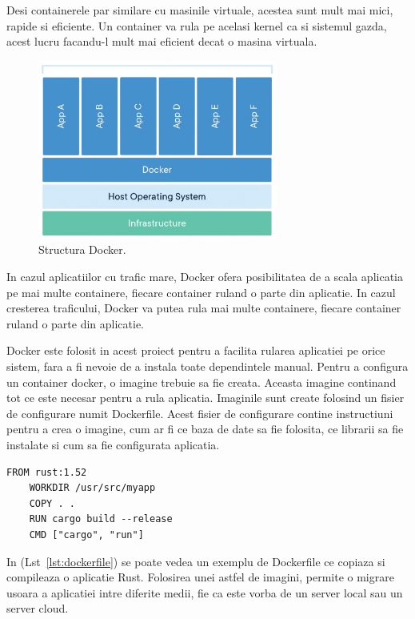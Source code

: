 \documentclass[titlepage,12pt]{article}
\begin{document}
Desi containerele par similare cu masinile virtuale, acestea sunt mult mai mici, rapide si eficiente.
Un container va rula pe acelasi kernel ca si sistemul gazda, acest lucru facandu-l mult mai eficient decat o masina virtuala.

\begin{figure}[H]
    \centering
    \includegraphics[width=0.7\textwidth]{images/dockerstructure}
    \caption{Structura Docker.}
    \label{fig:containerstructure}
\end{figure}

In cazul aplicatiilor cu trafic mare, Docker ofera posibilitatea de a scala aplicatia pe mai multe containere, fiecare container ruland o parte din aplicatie.
In cazul cresterea traficului, Docker va putea rula mai multe containere, fiecare container ruland o parte din aplicatie.

Docker este folosit in acest proiect pentru a facilita rularea aplicatiei pe orice sistem, fara a fi nevoie de a instala toate dependintele manual.
Pentru a configura un container docker, o imagine trebuie sa fie creata.
Aceasta imagine continand tot ce este necesar pentru a rula aplicatia.
Imaginile sunt create folosind un fisier de configurare numit Dockerfile.
Acest fisier de configurare contine instructiuni pentru a crea o imagine, cum ar fi ce baza de date sa fie folosita, ce librarii sa fie instalate si cum sa fie configurata aplicatia.
\begin{lstlisting}[language=docker,caption={Exemplu Dockerfile},label={lst:dockerfile}]
    FROM rust:1.52
    WORKDIR /usr/src/myapp
    COPY . .
    RUN cargo build --release
    CMD ["cargo", "run"]
\end{lstlisting}
In (Lst~\ref{lst:dockerfile}) se poate vedea un exemplu de Dockerfile ce copiaza si compileaza o aplicatie Rust.
Folosirea unei astfel de imagini, permite o migrare usoara a aplicatiei intre diferite medii, fie ca este vorba de un server local sau un server cloud.
\end{document}
